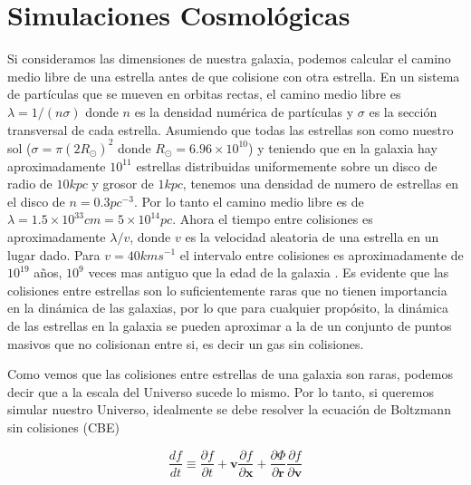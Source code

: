 \section{Simulaciones Cosmológicas}

Si consideramos las dimensiones de nuestra galaxia, podemos calcular el camino medio libre de una estrella antes de que colisione con otra estrella. En un sistema de partículas que se mueven en orbitas rectas, el camino medio libre es $\lambda = 1/(n\sigma)$ donde $n$ es la densidad numérica de partículas y $\sigma$ es la sección transversal de cada estrella. Asumiendo que todas las estrellas son como nuestro sol ($\sigma = \pi(2R_\odot)^2 $ donde $R_\odot = 6.96\times 10^{10}$) y teniendo que en la galaxia hay aproximadamente $10^{11}$ estrellas distribuidas uniformemente sobre un disco de radio de $10 kpc$ y grosor de $1 kpc$, tenemos una densidad de numero de estrellas en el disco de $n=0.3pc^{-3}$. Por lo tanto el camino medio libre es de $\lambda = 1.5 \times 10^{33} cm = 5\times 10^{14}pc$. Ahora el tiempo entre colisiones es aproximadamente $\lambda / v$, donde $v$ es la velocidad aleatoria de una estrella en un lugar dado. Para $v=40km s^{-1}$ el intervalo entre colisiones es aproximadamente de $10^{19}$ años, $10^9$ veces mas antiguo que la edad de la galaxia \cite{Binney1988-rs}. Es evidente que las colisiones entre estrellas son lo suficientemente raras que no tienen importancia en la dinámica de las galaxias, por lo que para cualquier propósito, la dinámica de las estrellas en la galaxia se pueden aproximar a la de un conjunto de puntos masivos que no colisionan entre si, es decir un gas sin colisiones.

Como vemos que las colisiones entre estrellas de una galaxia son raras, podemos decir que a la escala del Universo sucede lo mismo. Por lo tanto, si queremos simular nuestro Universo, idealmente se debe resolver la ecuación de Boltzmann sin colisiones (CBE)

\begin{equation}
    \frac{d f}{d t} \equiv \frac{\partial f}{\partial t} + \mathbf{v}\frac{\partial f}{\partial \mathbf{x}} + \frac{\partial \Phi}{\partial \mathbf{r}} \frac{\partial f}{\partial \mathbf{v}}
    \label{eq:CBE}
\end{equation}

